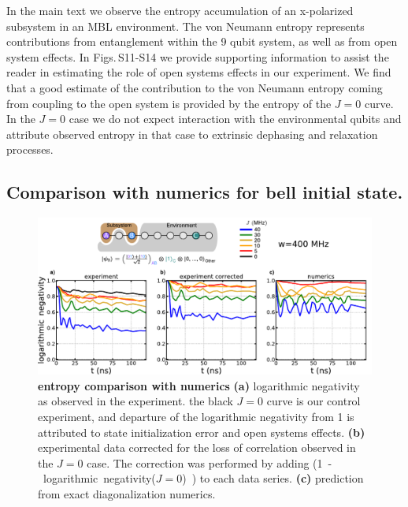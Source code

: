In the main text we observe the entropy accumulation of an x-polarized subsystem in an MBL environment.
The von Neumann entropy represents contributions from entanglement within the 9 qubit system, as well as from open system effects.  In Figs.\,S11-S14 we provide supporting information to assist the reader in estimating the role of open systems effects in our experiment.  We find that a good estimate of the contribution to the von Neumann entropy coming from coupling to the open system is provided by the entropy of the $J=0$ curve.  In the $J=0$ case we do not expect interaction with the environmental qubits and attribute observed entropy in that case to extrinsic dephasing and relaxation processes.

\subsection{Comparison with numerics for bell initial state.}
\begin{figure}[tbh]
\centering
\includegraphics[width=140mm, keepaspectratio]{./PDF/dat_cor_num_bell_linear.pdf}
\caption{\textbf{entropy comparison with numerics}
\textbf{(a)} logarithmic negativity as observed in the experiment.
the black $J=0$ curve is our control experiment, and departure of the logarithmic negativity from 1 is attributed to state initialization error and open systems effects.
\textbf{(b)} experimental data corrected for the loss of correlation observed in the $J=0$ case.  The correction was performed by adding \mbox{(1 - logarithmic negativity($J=0$) )} to each data series.
\textbf{(c)} prediction from exact diagonalization numerics.
}
\end{figure}

